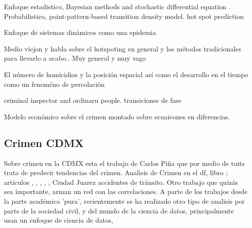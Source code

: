 \documentclass[onecolumn,12pt,letterpaper]{article}
\begin{document}
Enfoque estadistico\cite{noauthor_bayesian_nodate}, Bayesian methods and stochastic differential equation \cite{mohler_geographic_2012}. Probabilistico, point-pattern-based transition density model. hot spot prediction\cite{liu_criminal_2003} 

Enfoque de sistemas dinámicos como una epidemia \cite{gonzalez-parra_mathematical_2018} \cite{srivastav_modeling_2019} \cite{mcmillon_modeling_2014}


Medio viejon y habla sobre el hotspoting en general y los métodos tradicionales para llevarlo a acabo.\cite{bowers_prospective_2004}. Muy general y muy vago \cite{butorac_geography_2017}


El número de homicidios y la posición espacial así como el desarrollo en el tiempo como un fenoméno de percolación \cite{alves_spatial_2015} 

criminal inspector and ordinaru people. transiciones de fase \cite{perc_understanding_2013} 

Modelo económico sobre el crimen montado sobre ecuaicones en diferencias. \cite{freeman_spatial_1996}

\subsection{Crimen CDMX}
\label{sec:crimen-cdmx}

Sobre crimen en la CDMX esta el trabajo de Carlos Piña\cite{pina-garcia_exploring_2019} que por medio de tuits trata de predecir tendencias del crimen. Analisis de Crimen en el df, libro \cite{mendoza_tamano_2012}; artículos \cite{mata_mobile_2016}, \cite{vilalta_what_2016}, \cite{sanchez_salinas_robo_2016}, \cite{fuentes_flores_distribucion_2017}, \cite{cisneros_geografimiedo_2008}, Ciudad Juarez accidentes de tránsito\cite{hernandez_hernandez_alisis_2012}. Otro trabajo que quizás sea importante\cite{espinal-enriquez_analysis_2015}, arman un red con las correlaciones. A parte de los trabajos desde la parte académica 'pura', recientemente se ha realizado otro tipo de analisis por parte de la sociedad civil, y del mundo de la ciencia de  datos, principalmente usan un enfoque de ciencia de datos,   \cite{noauthor_delincuencia_nodate}
\cite{noauthor_crimen_nodate} \cite{noauthor_robo_nodate} \cite{noauthor_homicidios_nodate} \cite{noauthor_visualizar_nodate} \cite{que_nodate} \cite{infodatacivica.org_explorador_nodate} \cite{robo_nodate}






\end{document}
